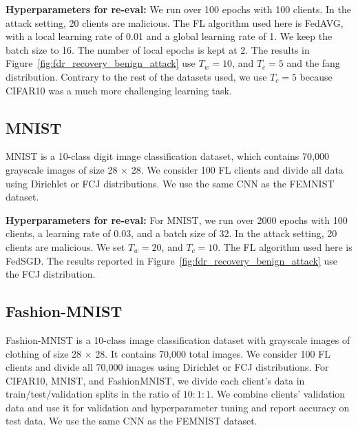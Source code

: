 \noindent\textbf{Hyperparameters for re-eval:} We run over 100 epochs with 100 clients. In the attack setting, 20 clients are malicious. The FL algorithm used here is FedAVG, with a local learning rate of 0.01 and a global learning rate of 1. We keep the batch size to 16. The number of local epochs is kept at $2$. The results in Figure~\ref{fig:fdr_recovery_benign_attack} use $T_w=10$, and $T_c=5$ and the fang distribution. Contrary to the rest of the datasets used, we use $T_c=5$ because CIFAR10 was a much more challenging learning task.





\subsection{MNIST~\cite{lecunmnist}}\label{setup:mnist}
MNIST is a 10-class digit image classification dataset, which contains 70,000 grayscale images of size 28 $\times$ 28. We consider 100 FL clients and divide all data using Dirichlet or FCJ distributions. We use the same CNN as the FEMNIST dataset.

\noindent\textbf{Hyperparameters for re-eval:} For MNIST, we run over 2000 epochs with 100 clients, a learning rate of $0.03$, and a batch size of 32. In the attack setting, 20 clients are malicious. We set $T_w=20$, and $T_c=10$. The FL algorithm used here is FedSGD. The results reported in Figure~\ref{fig:fdr_recovery_benign_attack} use the FCJ distribution.

\subsection{Fashion-MNIST~\cite{xiao2017fashion}}\label{setup:fashion}
Fashion-MNIST is a 10-class image classification dataset with grayscale images of clothing of size 28 $\times$ 28. It contains 70,000 total images. 
We consider 100 FL clients and divide all 70,000 images using Dirichlet or FCJ distributions.
For CIFAR10, MNIST, and FashionMNIST, we divide each client's data in train/test/validation splits in the ratio of $10:1:1$. We combine clients' validation data and use it for validation and hyperparameter tuning and report accuracy on test data. We use the same CNN as the FEMNIST dataset.

